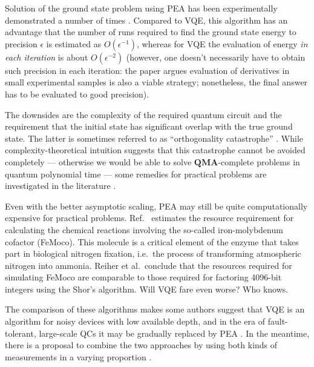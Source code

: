 Solution of the ground state problem using PEA has been experimentally demonstrated a number of times \cite{whitfield_ground_2012,lanyon_towards_2010,bauer_hybrid_2016,omalley_scalable_2016}. Compared to VQE, this algorithm has an advantage that the number of runs required to find the ground state energy to precision $\epsilon$ is estimated as $O(\epsilon^{-1})$, whereas for VQE the evaluation of energy \textit{in each iteration} is about $O(\epsilon^{-2})$ (however, one doesn't necessarily have to obtain such precision in each iteration: the paper \cite{sweke_stochastic_2019} argues evaluation of derivatives in small experimental samples is also a viable strategy; nonetheless, the final answer has to be evaluated to good precision). 

The downsides are the complexity of the required quantum circuit and the requirement that the initial state has significant overlap with the true ground state. The latter is sometimes referred to as ``orthogonality catastrophe'' \cite{kohn_nobel_1999}. While complexity-theoretical intuition suggests that this catastrophe cannot be avoided completely --- otherwise we would be able to solve $\mathbf{QMA}$-complete problems in quantum polynomial time --- some remedies for practical problems are investigated in the literature \cite{tubman_postponing_2018}.

Even with the better asymptotic scaling, PEA may still be quite computationally expensive for practical problems. Ref.~\cite{reiher_elucidating_2017} estimates the resource requirement for calculating the chemical reactions involving the so-called iron-molybdenum cofactor (FeMoco). This molecule is a critical element of the enzyme that takes part in biological nitrogen fixation, i.e.~the process of transforming atmospheric nitrogen into ammonia. Reiher et al.~conclude that the resources required for simulating FeMoco are comparable to those required for factoring 4096-bit integers using the Shor's algorithm. Will VQE fare even worse? Who knows.

The comparison of these algorithms makes some authors suggest that VQE is an algorithm for noisy devices with low available depth, and in the era of fault-tolerant, large-scale QCs it may be gradually replaced by PEA \cite{elfving_how_2020}. In the meantime, there is a proposal to combine the two approaches by using both kinds of measurements in a varying proportion \cite{wang_accelerated_2019}.